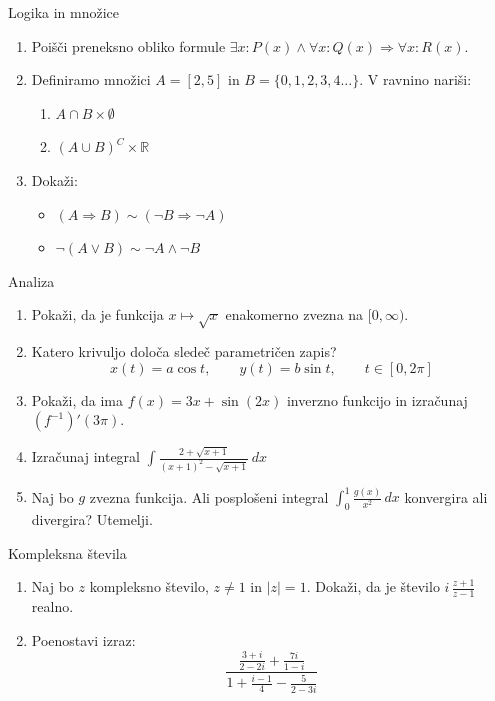\begin{frame}{Logika in množice}
	\begin{enumerate}
		\item
		Poišči preneksno obliko formule $\exists x:P(x) \wedge \forall x: Q(x) \Rightarrow \forall x: R(x)$.
		\item 
		Definiramo množici $A=[2,5]$ in $B=\{0,1,2,3,4\dots\}$.
		V ravnino nariši:
		\begin{enumerate}
		   \item $A \cap B \times \emptyset$
		   \item $(A \cup B)^C \times \mathbb{R}$
		\end{enumerate}
		\item
		Dokaži:
		\begin{itemize}
			\item $(A \Rightarrow B) \sim (\neg B \Rightarrow \neg A)$
			\item $\neg(A \vee B) \sim \neg A \wedge \neg B$
		\end{itemize}
	\end{enumerate}
\end{frame}

\begin{frame}{Analiza}
	\begin{enumerate}
		\item
		Pokaži, da je funkcija $x \mapsto \sqrt{x}$ enakomerno zvezna na $[0, \infty)$.
		\item 
		Katero krivuljo določa sledeč parametričen zapis?
		$$
		   x(t) = a \cos t, \qquad
		   y(t) = b \sin t, \qquad
		   t \in [0, 2 \pi]
		$$ 
		\item
		Pokaži, da ima $f(x)=3x+ \sin(2x)$ inverzno funkcijo in izračunaj $(f^{-1})'(3 \pi)$.
		
		\item
		Izračunaj integral 
		$\displaystyle \int \frac{2+\sqrt{x+1}}{(x+1)^2-\sqrt{x+1}}\, dx $
		  
		\item 
		Naj bo $g$ zvezna funkcija. Ali posplošeni integral 
		$\int_{0}^{1} \frac{g(x)}{x^2}\,dx $
		konvergira ali divergira? Utemelji.
	\end{enumerate}
\end{frame}

\begin{frame}{Kompleksna števila}
	\begin{enumerate}
		\item
		Naj bo $z$ kompleksno število, $z \ne 1$ in $\lvert z \rvert = 1$.
		Dokaži, da je število \( i \, \frac{z+1}{z-1} \) realno.
		\item
		Poenostavi izraz:
		\[\frac{\frac{3+i}{2-2i}+\frac{7i}{1-i}}{1+\frac{i-1}{4}-\frac{5}{2-3i}} \]
	\end{enumerate}
\end{frame}